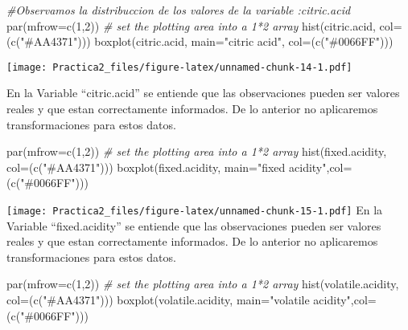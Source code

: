 \documentclass[
]{article}
\newenvironment{Shaded}{\begin{snugshade}}{\end{snugshade}}
\newcommand{\AttributeTok}[1]{\textcolor[rgb]{0.77,0.63,0.00}{#1}}
\newcommand{\CommentTok}[1]{\textcolor[rgb]{0.56,0.35,0.01}{\textit{#1}}}
\newcommand{\DecValTok}[1]{\textcolor[rgb]{0.00,0.00,0.81}{#1}}
\newcommand{\FunctionTok}[1]{\textcolor[rgb]{0.00,0.00,0.00}{#1}}
\newcommand{\NormalTok}[1]{#1}
\newcommand{\StringTok}[1]{\textcolor[rgb]{0.31,0.60,0.02}{#1}}
\begin{document}
\begin{Shaded}
\begin{Highlighting}[]
\CommentTok{\#Observamos la distribuccion de los valores de la variable :citric.acid}
\FunctionTok{par}\NormalTok{(}\AttributeTok{mfrow=}\FunctionTok{c}\NormalTok{(}\DecValTok{1}\NormalTok{,}\DecValTok{2}\NormalTok{))    }\CommentTok{\# set the plotting area into a 1*2 array}
\FunctionTok{hist}\NormalTok{(citric.acid, }\AttributeTok{col=}\NormalTok{(}\FunctionTok{c}\NormalTok{(}\StringTok{"\#AA4371"}\NormalTok{)))}
\FunctionTok{boxplot}\NormalTok{(citric.acid, }\AttributeTok{main=}\StringTok{"citric acid"}\NormalTok{, }\AttributeTok{col=}\NormalTok{(}\FunctionTok{c}\NormalTok{(}\StringTok{"\#0066FF"}\NormalTok{)))}
\end{Highlighting}
\end{Shaded}

\texttt{[image: Practica2\_files/figure-latex/unnamed-chunk-14-1.pdf]}

En la Variable ``citric.acid'' se entiende que las observaciones pueden
ser valores reales y que estan correctamente informados. De lo anterior
no aplicaremos transformaciones para estos datos.

\begin{Shaded}
\begin{Highlighting}[]
\FunctionTok{par}\NormalTok{(}\AttributeTok{mfrow=}\FunctionTok{c}\NormalTok{(}\DecValTok{1}\NormalTok{,}\DecValTok{2}\NormalTok{))    }\CommentTok{\# set the plotting area into a 1*2 array}
\FunctionTok{hist}\NormalTok{(fixed.acidity, }\AttributeTok{col=}\NormalTok{(}\FunctionTok{c}\NormalTok{(}\StringTok{"\#AA4371"}\NormalTok{)))}
\FunctionTok{boxplot}\NormalTok{(fixed.acidity, }\AttributeTok{main=}\StringTok{"fixed acidity"}\NormalTok{,}\AttributeTok{col=}\NormalTok{(}\FunctionTok{c}\NormalTok{(}\StringTok{"\#0066FF"}\NormalTok{)))}
\end{Highlighting}
\end{Shaded}

\texttt{[image: Practica2\_files/figure-latex/unnamed-chunk-15-1.pdf]} En
la Variable ``fixed.acidity'' se entiende que las observaciones pueden
ser valores reales y que estan correctamente informados. De lo anterior
no aplicaremos transformaciones para estos datos.

\begin{Shaded}
\begin{Highlighting}[]
\FunctionTok{par}\NormalTok{(}\AttributeTok{mfrow=}\FunctionTok{c}\NormalTok{(}\DecValTok{1}\NormalTok{,}\DecValTok{2}\NormalTok{))    }\CommentTok{\# set the plotting area into a 1*2 array}
\FunctionTok{hist}\NormalTok{(volatile.acidity, }\AttributeTok{col=}\NormalTok{(}\FunctionTok{c}\NormalTok{(}\StringTok{"\#AA4371"}\NormalTok{)))}
\FunctionTok{boxplot}\NormalTok{(volatile.acidity, }\AttributeTok{main=}\StringTok{"volatile acidity"}\NormalTok{,}\AttributeTok{col=}\NormalTok{(}\FunctionTok{c}\NormalTok{(}\StringTok{"\#0066FF"}\NormalTok{)))}
\end{Highlighting}
\end{Shaded}
\end{document}
